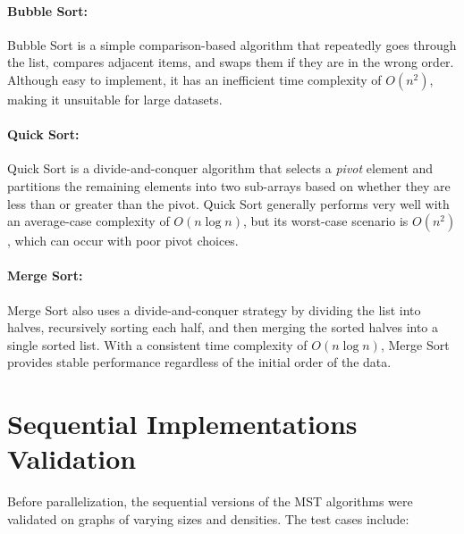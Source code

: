 \documentclass[11pt]{article}
\begin{document}
\paragraph{Bubble Sort:} 
Bubble Sort is a simple comparison-based algorithm that repeatedly goes through the list, compares adjacent items, and swaps them if they are in the wrong order. Although easy to implement, it has an inefficient time complexity of $O(n^2)$, making it unsuitable for large datasets.

\paragraph{Quick Sort:} 
Quick Sort is a divide-and-conquer algorithm that selects a \emph{pivot} element and partitions the remaining elements into two sub-arrays based on whether they are less than or greater than the pivot. Quick Sort generally performs very well with an average-case complexity of $O(n \log n)$, but its worst-case scenario is $O(n^2)$, which can occur with poor pivot choices.

\paragraph{Merge Sort:} 
Merge Sort also uses a divide-and-conquer strategy by dividing the list into halves, recursively sorting each half, and then merging the sorted halves into a single sorted list. With a consistent time complexity of $O(n \log n)$, Merge Sort provides stable performance regardless of the initial order of the data.

\section{Sequential Implementations Validation}
Before parallelization, the sequential versions of the MST algorithms were validated on graphs of varying sizes and densities. The test cases include:
\end{document}
